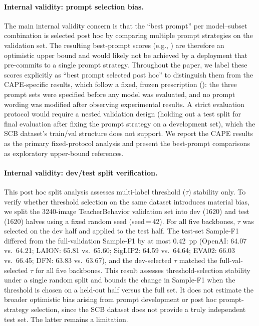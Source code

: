 \documentclass[symmetry,article,submit,pdftex,moreauthors]{Definitions/mdpi}
\begin{document}
\paragraph{Internal validity: prompt selection bias.}
The main internal validity concern is that the ``best prompt'' per model--subset combination is selected post hoc by comparing multiple prompt strategies on the validation set. The resulting best-prompt scores (e.g., ) are therefore an optimistic upper bound and would likely not be achieved by a deployment that pre-commits to a single prompt strategy. Throughout the paper, we label these scores explicitly as ``best prompt selected post hoc'' to distinguish them from the CAPE-specific results, which follow a fixed, frozen prescription (): the three prompt sets were specified before any model was evaluated, and no prompt wording was modified after observing experimental results. A strict evaluation protocol would require a nested validation design (holding out a test split for final evaluation after fixing the prompt strategy on a development set), which the SCB dataset's train/val structure does not support. We report the CAPE results as the primary fixed-protocol analysis and present the best-prompt comparisons as exploratory upper-bound references.

\paragraph{Internal validity: dev/test split verification.}
This post hoc split analysis assesses multi-label threshold ($\tau$) stability only. To verify whether threshold selection on the same dataset introduces material bias, we split the 3240-image TeacherBehavior validation set into dev (1620) and test (1620) halves using a fixed random seed (seed\,=\,42). For all five backbones, $\tau$ was selected on the dev half and applied to the test half. The test-set Sample-F1 differed from the full-validation Sample-F1 by at most 0.42~pp (OpenAI: 64.07 vs.\ 64.21; LAION: 65.81 vs.\ 65.60; SigLIP2: 64.59 vs.\ 64.64; EVA02: 66.03 vs.\ 66.45; DFN: 63.83 vs.\ 63.67), and the dev-selected $\tau$ matched the full-val-selected $\tau$ for all five backbones. This result assesses threshold-selection stability under a single random split and bounds the change in Sample-F1 when the threshold is chosen on a held-out half versus the full set. It does not estimate the broader optimistic bias arising from prompt development or post hoc prompt-strategy selection, since the SCB dataset does not provide a truly independent test set. The latter remains a limitation.
\end{document}
